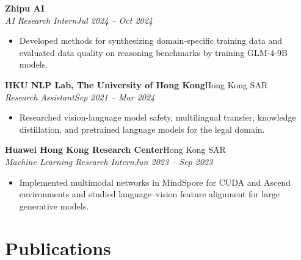 \documentclass[10pt,a4paper]{article}
\newcommand{\cvheading}[4]{%
  \textbf{#1}\hfill #2\\[-1pt]
  \textit{#3}\hfill\textit{#4}\par
}
\begin{document}
\vspace{0.25em}
\cvheading{Zhipu AI}{}
  {AI Research Intern}{Jul 2024 -- Oct 2024}
\begin{itemize}
  \item Developed methods for synthesizing domain-specific training data and evaluated data quality on reasoning benchmarks by training GLM-4-9B models.
\end{itemize}

\vspace{0.25em}
\cvheading{HKU NLP Lab, The University of Hong Kong}{Hong Kong SAR}
  {Research Assistant}{Sep 2021 -- Mar 2024}
\begin{itemize}
  \item Researched vision-language model safety, multilingual transfer, knowledge distillation, and pretrained language models for the legal domain.
\end{itemize}

\vspace{0.25em}
\cvheading{Huawei Hong Kong Research Center}{Hong Kong SAR}
  {Machine Learning Research Intern}{Jun 2023 -- Sep 2023}
\begin{itemize}
  \item Implemented multimodal networks in MindSpore for CUDA and Ascend environments and studied language--vision feature alignment for large generative models.
\end{itemize}

\section{Publications}


\end{document}

